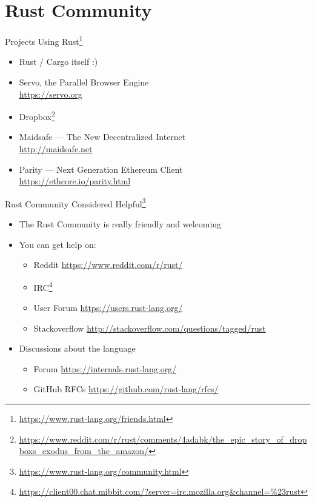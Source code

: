 \section{Rust Community}

\begin{frame}{Projects Using Rust\footnote{\url{https://www.rust-lang.org/friends.html}}}
\begin{itemize}
\item Rust / Cargo itself :)
\item Servo, the Parallel Browser Engine\\
  {\footnotesize\url{https://servo.org}}
\item Dropbox\footnote{\url{https://www.reddit.com/r/rust/comments/4adabk/the_epic_story_of_dropboxs_exodus_from_the_amazon/}}
\item Maidsafe --- The New Decentralized Internet\\
  {\footnotesize\url{http://maidsafe.net}}
\item Parity --- Next Generation Ethereum Client\\
  {\footnotesize\url{https://ethcore.io/parity.html}}
\end{itemize}
\end{frame}

\begin{frame}{Rust Community Considered Helpful\footnote{\url{https://www.rust-lang.org/community.html}}}
\begin{itemize}
\item The Rust Community is really friendly and welcoming
\item You can get help on:
    \begin{itemize}
        \item Reddit {\url{https://www.reddit.com/r/rust/}}
        \item IRC\footnote{\url{https://client00.chat.mibbit.com/?server=irc.mozilla.org&channel=\%23rust}}
        \item User Forum \url{https://users.rust-lang.org/}
        \item Stackoverflow \url{http://stackoverflow.com/questions/tagged/rust}
    \end{itemize}
\item Discussions about the language
    \begin{itemize}
        \item Forum \url{https://internals.rust-lang.org/}
        \item GitHub RFCs \url{https://github.com/rust-lang/rfcs/}
    \end{itemize}
\end{itemize}
\end{frame}

